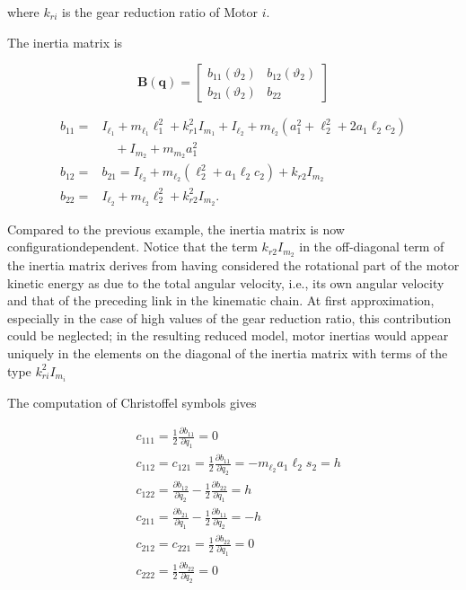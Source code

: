 \documentclass[10pt]{article}
\begin{document}
where $k_{r i}$ is the gear reduction ratio of Motor $i$.

The inertia matrix is

$$
\boldsymbol{B}(\boldsymbol{q})=\left[\begin{array}{cc}
b_{11}\left(\vartheta_{2}\right) & b_{12}\left(\vartheta_{2}\right) \\
b_{21}\left(\vartheta_{2}\right) & b_{22}
\end{array}\right]
$$

$$
\begin{aligned}
b_{11}= & I_{\ell_{1}}+m_{\ell_{1}} \ell_{1}^{2}+k_{r 1}^{2} I_{m_{1}}+I_{\ell_{2}}+m_{\ell_{2}}\left(a_{1}^{2}+\ell_{2}^{2}+2 a_{1} \ell_{2} c_{2}\right) \\
& \quad+I_{m_{2}}+m_{m_{2}} a_{1}^{2} \\
b_{12}= & b_{21}=I_{\ell_{2}}+m_{\ell_{2}}\left(\ell_{2}^{2}+a_{1} \ell_{2} c_{2}\right)+k_{r 2} I_{m_{2}} \\
b_{22}= & I_{\ell_{2}}+m_{\ell_{2}} \ell_{2}^{2}+k_{r 2}^{2} I_{m_{2}} .
\end{aligned}
$$

Compared to the previous example, the inertia matrix is now configurationdependent. Notice that the term $k_{r 2} I_{m_{2}}$ in the off-diagonal term of the inertia matrix derives from having considered the rotational part of the motor kinetic energy as due to the total angular velocity, i.e., its own angular velocity and that of the preceding link in the kinematic chain. At first approximation, especially in the case of high values of the gear reduction ratio, this contribution could be neglected; in the resulting reduced model, motor inertias would appear uniquely in the elements on the diagonal of the inertia matrix with terms of the type $k_{r i}^{2} I_{m_{i}}$

The computation of Christoffel symbols gives

$$
\begin{aligned}
& c_{111}=\frac{1}{2} \frac{\partial b_{11}}{\partial q_{1}}=0 \\
& c_{112}=c_{121}=\frac{1}{2} \frac{\partial b_{11}}{\partial q_{2}}=-m_{\ell_{2}} a_{1} \ell_{2} s_{2}=h \\
& c_{122}=\frac{\partial b_{12}}{\partial q_{2}}-\frac{1}{2} \frac{\partial b_{22}}{\partial q_{1}}=h \\
& c_{211}=\frac{\partial b_{21}}{\partial q_{1}}-\frac{1}{2} \frac{\partial b_{11}}{\partial q_{2}}=-h \\
& c_{212}=c_{221}=\frac{1}{2} \frac{\partial b_{22}}{\partial q_{1}}=0 \\
& c_{222}=\frac{1}{2} \frac{\partial b_{22}}{\partial q_{2}}=0
\end{aligned}
$$
\end{document}
